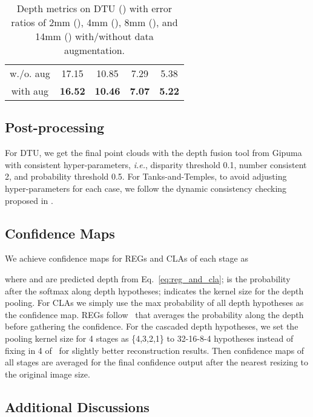 \documentclass[10pt]{article} \usepackage[preprint]{tmlr}
\begin{document}
\begin{table}[h]
\small
\centering
\caption{Depth metrics on DTU () with error ratios of 2mm (), 4mm (), 8mm (), and 14mm () with/without data augmentation.\label{tab:color_aug}}
\begin{tabular}{ccccc}
\toprule 
 &  &  &  & \tabularnewline
\midrule
w./o. aug & 17.15 & 10.85 & 7.29 & 5.38\tabularnewline
with aug & \textbf{16.52} & \textbf{10.46} & \textbf{7.07} & \textbf{5.22}\tabularnewline
\bottomrule
\end{tabular}
\end{table}

\subsection{Post-processing}
For DTU, we get the final point clouds with the depth fusion tool from Gipuma~\citep{Galliani_2015_ICCV} with consistent hyper-parameters, \emph{i.e.}, disparity threshold 0.1, number consistent 2, and probability threshold 0.5. 
For Tanks-and-Temples, to avoid adjusting hyper-parameters for each case, we follow the dynamic consistency checking proposed in \citet{yan2020dense}.

\subsection{Confidence Maps}
\label{sec:appendix_conf}
We achieve confidence maps for REGs and CLAs of each stage as

where  and  are predicted depth from Eq.~\ref{eq:reg_and_cla};  is the probability after the softmax along depth hypotheses;  indicates the kernel size for the depth pooling.
For CLAs we simply use the max probability of all depth hypotheses as the confidence map. REGs follow~\citet{yao2018mvsnet} that averages the probability along the depth before gathering the confidence. For the cascaded depth hypotheses, we set the pooling kernel size  for 4 stages as \{4,3,2,1\} to 32-16-8-4 hypotheses instead of fixing in 4 of~\citet{yao2018mvsnet} for slightly better reconstruction results.
Then confidence maps of all stages are averaged for the final confidence output after the nearest resizing to the original image size.

\subsection{Additional Discussions}
\end{document}
